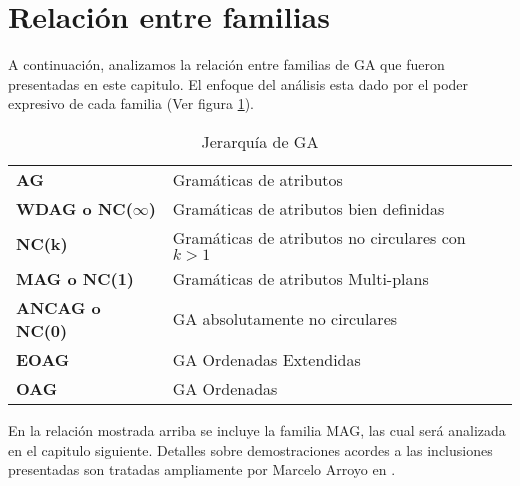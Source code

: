 \section{Relación entre familias}

A continuación, analizamos la relación entre familias de GA que fueron presentadas en este capitulo. El enfoque del análisis esta dado por el poder expresivo de cada familia (Ver figura \ref{jer-GA}).

\begin{table}[!h]\centering
\begin{tabular}{ll}
\textbf{AG}         & Gramáticas de atributos \\
\textbf{WDAG o NC($\infty$)}       & Gramáticas de atributos bien definidas\\
\textbf{NC(k)}       & Gramáticas de atributos no circulares con $k > 1$\\
\textbf{MAG o NC(1)}       & Gramáticas de atributos Multi-plans\\
\textbf{ANCAG o NC(0)}      & GA absolutamente no circulares \\
\textbf{EOAG}       & GA Ordenadas Extendidas \\
\textbf{OAG}        & GA Ordenadas \\
\end{tabular}
\caption{Jerarquía de GA}
\label{jer-GA}
\end{table}

En la relación mostrada arriba se incluye la familia MAG, las cual será analizada en el capitulo siguiente.
Detalles sobre demostraciones acordes a las inclusiones presentadas son tratadas ampliamente por Marcelo Arroyo en \cite{tesismarcelo}.